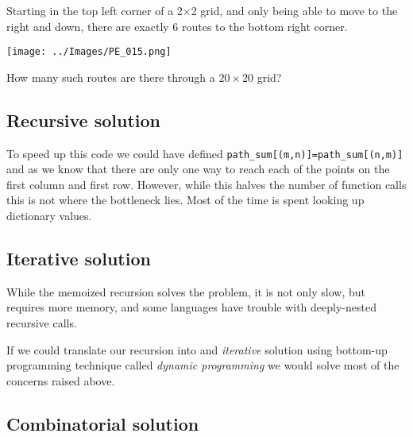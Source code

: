 

\begin{ProjectEuler}{15}
  Starting in the top left corner of a 2×2 grid, and only being able to move to
  the right and down, there are exactly 6 routes to the bottom right corner.
  \begin{center}
    \texttt{[image: ../Images/PE\_015.png]}
  \end{center}
  How many such routes are there through a $20\times20$ grid?
\end{ProjectEuler}

\subsection{Recursive solution}



To speed up this code we could have defined
\lstinline|path_sum[(m,n)]=path_sum[(n,m)]| and as we know that there are only
one way to reach each of the points on the first column and first row. However,
while this halves the number of function calls this is not where the bottleneck
lies. Most of the time is spent looking up dictionary values. 

\newpage

\subsection{Iterative solution}

While the memoized recursion solves the problem, it is not only slow, but
requires more memory, and some languages have trouble with deeply-nested
recursive calls.

If we could translate our recursion into and \emph{iterative} solution using
bottom-up programming technique called \emph{dynamic programming} we would solve
most of the concerns raised above. 


\subsection{Combinatorial solution}
                 


